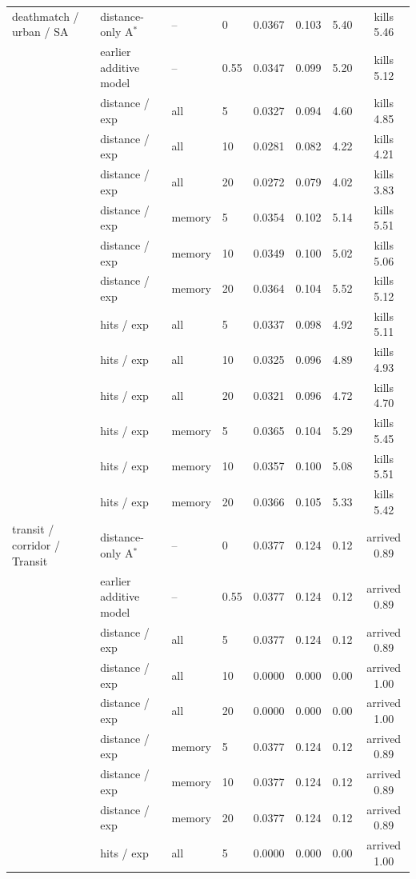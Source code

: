 \begin{tabular}{llllcccc}
\midrule
deathmatch / urban / SA & distance-only A$^*$ & -- & 0 & 0.0367 & 0.103 & 5.40 & kills 5.46 \\
 & earlier additive model & -- & 0.55 & 0.0347 & 0.099 & 5.20 & kills 5.12 \\
 & distance / exp & all & 5 & 0.0327 & 0.094 & 4.60 & kills 4.85 \\
 & distance / exp & all & 10 & 0.0281 & 0.082 & 4.22 & kills 4.21 \\
 & distance / exp & all & 20 & 0.0272 & 0.079 & 4.02 & kills 3.83 \\
 & distance / exp & memory & 5 & 0.0354 & 0.102 & 5.14 & kills 5.51 \\
 & distance / exp & memory & 10 & 0.0349 & 0.100 & 5.02 & kills 5.06 \\
 & distance / exp & memory & 20 & 0.0364 & 0.104 & 5.52 & kills 5.12 \\
 & hits / exp & all & 5 & 0.0337 & 0.098 & 4.92 & kills 5.11 \\
 & hits / exp & all & 10 & 0.0325 & 0.096 & 4.89 & kills 4.93 \\
 & hits / exp & all & 20 & 0.0321 & 0.096 & 4.72 & kills 4.70 \\
 & hits / exp & memory & 5 & 0.0365 & 0.104 & 5.29 & kills 5.45 \\
 & hits / exp & memory & 10 & 0.0357 & 0.100 & 5.08 & kills 5.51 \\
 & hits / exp & memory & 20 & 0.0366 & 0.105 & 5.33 & kills 5.42 \\
\midrule
transit / corridor / Transit & distance-only A$^*$ & -- & 0 & 0.0377 & 0.124 & 0.12 & arrived 0.89 \\
 & earlier additive model & -- & 0.55 & 0.0377 & 0.124 & 0.12 & arrived 0.89 \\
 & distance / exp & all & 5 & 0.0377 & 0.124 & 0.12 & arrived 0.89 \\
 & distance / exp & all & 10 & 0.0000 & 0.000 & 0.00 & arrived 1.00 \\
 & distance / exp & all & 20 & 0.0000 & 0.000 & 0.00 & arrived 1.00 \\
 & distance / exp & memory & 5 & 0.0377 & 0.124 & 0.12 & arrived 0.89 \\
 & distance / exp & memory & 10 & 0.0377 & 0.124 & 0.12 & arrived 0.89 \\
 & distance / exp & memory & 20 & 0.0377 & 0.124 & 0.12 & arrived 0.89 \\
 & hits / exp & all & 5 & 0.0000 & 0.000 & 0.00 & arrived 1.00 \\

\end{tabular}
